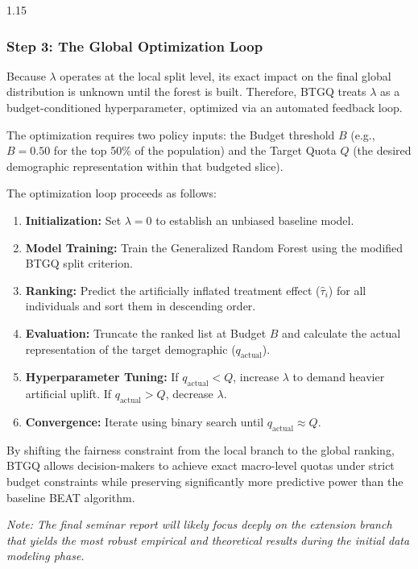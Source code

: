 \documentclass[11pt, a4paper]{article}
\begin{document}
\begin{spacing}{1.15}
\subsubsection*{Step 3: The Global Optimization Loop}
Because $\lambda$ operates at the local split level, its exact impact on the final global distribution is unknown until the forest is built. Therefore, BTGQ treats $\lambda$ as a budget-conditioned hyperparameter, optimized via an automated feedback loop.

The optimization requires two policy inputs: the Budget threshold $B$ (e.g., $B = 0.50$ for the top 50\% of the population) and the Target Quota $Q$ (the desired demographic representation within that budgeted slice).

The optimization loop proceeds as follows:
\begin{enumerate}
    \item \textbf{Initialization:} Set $\lambda = 0$ to establish an unbiased baseline model.
    \item \textbf{Model Training:} Train the Generalized Random Forest using the modified BTGQ split criterion.
    \item \textbf{Ranking:} Predict the artificially inflated treatment effect ($\hat{\tau}_i$) for all individuals and sort them in descending order.
    \item \textbf{Evaluation:} Truncate the ranked list at Budget $B$ and calculate the actual representation of the target demographic ($q_{\text{actual}}$).
    \item \textbf{Hyperparameter Tuning:} If $q_{\text{actual}} < Q$, increase $\lambda$ to demand heavier artificial uplift. If $q_{\text{actual}} > Q$, decrease $\lambda$.
    \item \textbf{Convergence:} Iterate using binary search until $q_{\text{actual}} \approx Q$. 
\end{enumerate}

By shifting the fairness constraint from the local branch to the global ranking, BTGQ allows decision-makers to achieve exact macro-level quotas under strict budget constraints while preserving significantly more predictive power than the baseline BEAT algorithm.

\textit{Note: The final seminar report will likely focus deeply on the extension branch that yields the most robust empirical and theoretical results during the initial data modeling phase.}

\newpage

\nocite{*}


\end{spacing}
\end{document}
